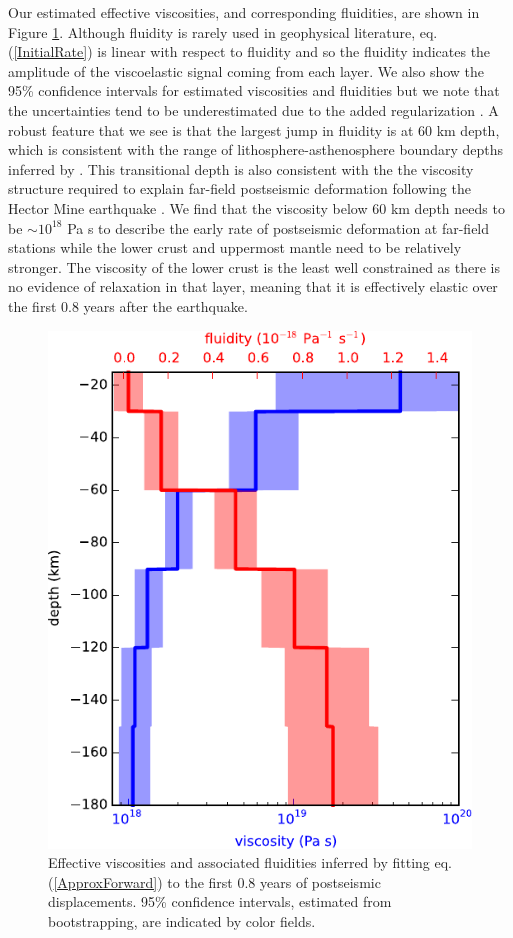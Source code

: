 \documentclass[draft,linenumbers]{AGUJournal}
\begin{document}
Our estimated effective viscosities, and corresponding fluidities, are shown in Figure \ref{fig:EffectiveViscosity}.  Although fluidity is rarely used in geophysical literature, eq. (\ref{InitialRate}) is linear with respect to fluidity and so the fluidity indicates the amplitude of the viscoelastic signal coming from each layer.  We also show the 95\% confidence intervals for estimated viscosities and fluidities but we note that the uncertainties tend to be underestimated due to the added regularization \citep{Aster2011}.  A robust feature that we see is that the largest jump in fluidity is at 60 km depth, which is consistent with the range of lithosphere-asthenosphere boundary depths inferred by \citet{Lekic2011}. This transitional depth is also consistent with the the viscosity structure required to explain far-field postseismic deformation following the Hector Mine earthquake \citep{Freed2007a}. We find that the viscosity below 60 km depth needs to be ${\sim}10^{18}$ Pa s to describe the early rate of postseismic deformation at far-field stations while the lower crust and uppermost mantle need to be relatively stronger.  The viscosity of the lower crust is the least well constrained as there is no evidence of relaxation in that layer, meaning that it is effectively elastic over the first 0.8 years after the earthquake.  

\begin{figure}
\includegraphics[scale=0.8]{Figures/EffectiveViscosity}
\centering 
\caption{Effective viscosities and associated fluidities inferred by fitting eq. (\ref{ApproxForward}) to the first 0.8 years of postseismic displacements. 95\% confidence intervals, estimated from bootstrapping, are indicated by color fields.}
\label{fig:EffectiveViscosity}
\end{figure} 
\end{document}
